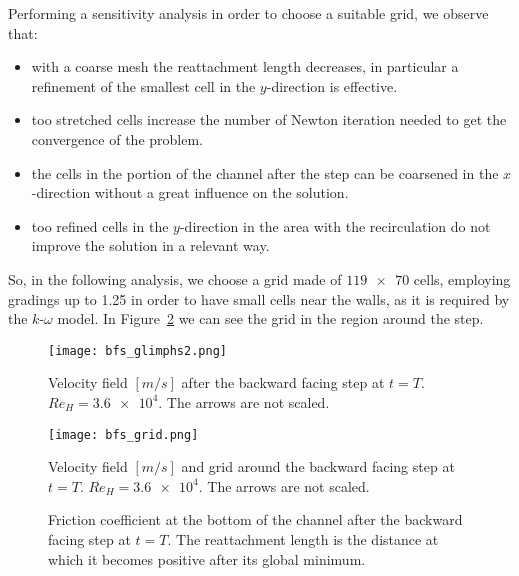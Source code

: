 Performing a sensitivity analysis in order to choose a suitable grid, we observe that:
\begin{itemize}
	\item with a coarse mesh the reattachment length decreases, in particular a refinement of the smallest cell in the $y$-direction is effective.
	\item too stretched cells increase the number of Newton iteration needed to get the convergence of the problem.
	\item the cells in the portion of the channel after the step can be coarsened in the $x$-direction without a great influence on the solution.
	\item too refined cells in the $y$-direction in the area with the 
	recirculation do not improve the solution in a relevant way.
\end{itemize}
So, in the following analysis, we choose a grid made of $\num{119x70}$ cells, employing gradings up to 1.25 in order to have small cells near the walls, as it is required by the $k\text{-}\omega$ model. In Figure~\ref{fig:bfsgrid} we can see the grid in the region around the step.

\begin{figure} %
	\centering
	\texttt{[image: bfs\_glimphs2.png]}
	\caption[Velocity field after the backward facing step]{Velocity field $[\si{m/s}]$ after the backward facing step at $t=T$. $Re_H=\num{3.6e4}$. The arrows are not scaled.}
	\label{fig:bfsarrows}
\end{figure}
\begin{figure}
	\centering
	\texttt{[image: bfs\_grid.png]}
	\caption[Velocity field and grid around the backward facing step]{Velocity field $[\si{m/s}]$ and grid around the backward facing step at $t=T$. $Re_H=\num{3.6e4}$. The arrows are not scaled.}
	\label{fig:bfsgrid}
\end{figure}
\begin{figure}[t]
	\centering
	
	\caption[Friction coefficient in the backward facing step test]{Friction coefficient at the bottom of the channel after the backward facing step at $t=T$. The reattachment length is the distance at which it becomes positive after its global minimum.}
	\label{fig:bfscf}
\end{figure}

